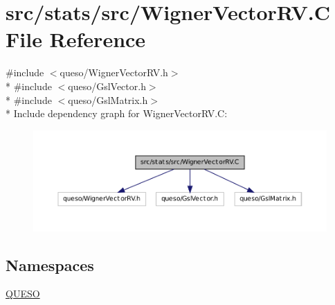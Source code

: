 \hypertarget{_wigner_vector_r_v_8_c}{\section{src/stats/src/\-Wigner\-Vector\-R\-V.C File Reference}
\label{_wigner_vector_r_v_8_c}
}
{\ttfamily \#include $<$queso/\-Wigner\-Vector\-R\-V.\-h$>$}\\*
{\ttfamily \#include $<$queso/\-Gsl\-Vector.\-h$>$}\\*
{\ttfamily \#include $<$queso/\-Gsl\-Matrix.\-h$>$}\\*
Include dependency graph for Wigner\-Vector\-R\-V.\-C\-:
\nopagebreak
\begin{figure}[H]
\begin{center}
\leavevmode
\includegraphics[width=350pt]{_wigner_vector_r_v_8_c__incl}
\end{center}
\end{figure}
\subsection*{Namespaces}
\begin{DoxyCompactItemize}
\item 
\hyperlink{namespace_q_u_e_s_o}{Q\-U\-E\-S\-O}
\end{DoxyCompactItemize}
